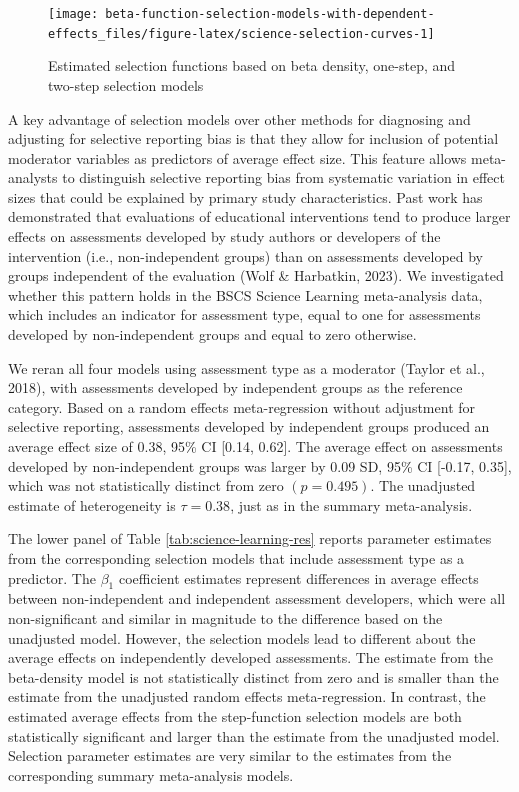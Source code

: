 \documentclass[
  man, donotrepeattitle,floatsintext]{apa7}
\begin{document}
\begin{figure}[tb]
\texttt{[image: beta-function-selection-models-with-dependent-effects\_files/figure-latex/science-selection-curves-1]} \caption{Estimated selection functions based on beta density, one-step, and two-step selection models}\label{fig:science-selection-curves}
\end{figure}

A key advantage of selection models over other methods for diagnosing and adjusting for selective reporting bias is that they allow for inclusion of potential moderator variables as predictors of average effect size. This feature allows meta-analysts to distinguish selective reporting bias from systematic variation in effect sizes that could be explained by primary study characteristics.
Past work has demonstrated that evaluations of educational interventions tend to produce larger effects on assessments developed by study authors or developers of the intervention (i.e., non-independent groups) than on assessments developed by groups independent of the evaluation (Wolf \& Harbatkin, 2023).
We investigated whether this pattern holds in the BSCS Science Learning meta-analysis data, which includes an indicator for assessment type, equal to one for assessments developed by non-independent groups and equal to zero otherwise.

We reran all four models using assessment type as a moderator (Taylor et al., 2018), with assessments developed by independent groups as the reference category.
Based on a random effects meta-regression without adjustment for selective reporting, assessments developed by independent groups produced an average effect size of 0.38, 95\% CI {[}0.14, 0.62{]}.
The average effect on assessments developed by non-independent groups was larger by 0.09 SD, 95\% CI {[}-0.17, 0.35{]}, which was not statistically distinct from zero \((p = 0.495)\).
The unadjusted estimate of heterogeneity is \(\tau = 0.38\), just as in the summary meta-analysis.

The lower panel of Table \ref{tab:science-learning-res} reports parameter estimates from the corresponding selection models that include assessment type as a predictor.
The \(\beta_1\) coefficient estimates represent differences in average effects between non-independent and independent assessment developers, which were all non-significant and similar in magnitude to the difference based on the unadjusted model.
However, the selection models lead to different about the average effects on independently developed assessments.
The estimate from the beta-density model is not statistically distinct from zero and is smaller than the estimate from the unadjusted random effects meta-regression.
In contrast, the estimated average effects from the step-function selection models are both statistically significant and larger than the estimate from the unadjusted model.
Selection parameter estimates are very similar to the estimates from the corresponding summary meta-analysis models.
\end{document}
